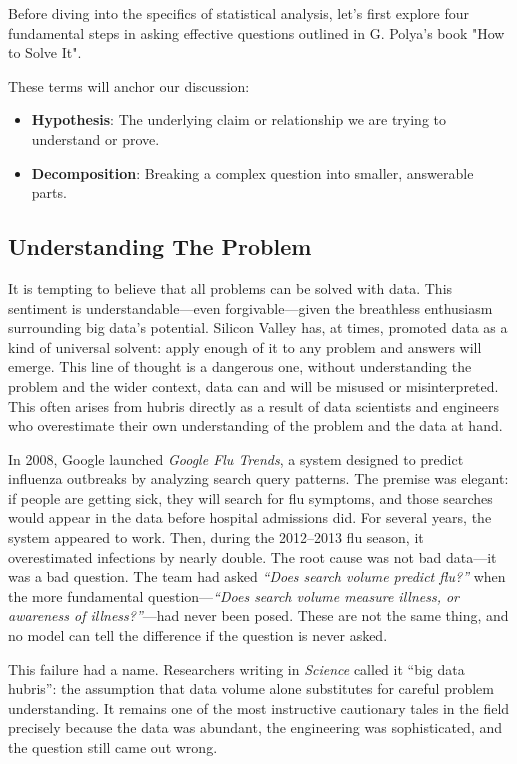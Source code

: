 Before diving into the specifics of statistical analysis, let's first explore four fundamental steps in asking effective questions outlined in G. Polya's book "How to Solve It".

\begin{keyterms}
These terms will anchor our discussion:
\begin{itemize}
    \item \textbf{Hypothesis}: The underlying claim or relationship we are trying to understand or prove.
    \item \textbf{Decomposition}: Breaking a complex question into smaller, answerable parts.
\end{itemize}
\end{keyterms}

\subsection{Understanding The Problem}

It is tempting to believe that all problems can be solved with data. 
This sentiment is understandable---even forgivable---given the breathless 
enthusiasm surrounding big data's potential. Silicon Valley has, at times, 
promoted data as a kind of universal solvent: apply enough of it to any 
problem and answers will emerge.
This line of thought is a dangerous one, without understanding the problem and the wider context, data can and will be misused or misinterpreted.
This often arises from hubris directly as a result of data scientists and engineers who overestimate their own understanding of the problem and the data at hand.

\begin{realworld}
In 2008, Google launched \textit{Google Flu Trends}, a system designed to 
predict influenza outbreaks by analyzing search query patterns. The premise 
was elegant: if people are getting sick, they will search for flu symptoms, 
and those searches would appear in the data before hospital admissions did. 
For several years, the system appeared to work. Then, during the 2012--2013 
flu season, it overestimated infections by nearly double. The root cause was 
not bad data---it was a bad question. The team had asked 
\textit{``Does search volume predict flu?''} when the more fundamental 
question---\textit{``Does search volume measure illness, or awareness of 
illness?''}---had never been posed. These are not the same thing, and no 
model can tell the difference if the question is never asked.

This failure had a name. Researchers writing in \textit{Science} called it 
``big data hubris'': the assumption that data volume alone substitutes for 
careful problem understanding. It remains one of the most instructive 
cautionary tales in the field precisely because the data was abundant, 
the engineering was sophisticated, and the question still came out wrong.
\end{realworld}


